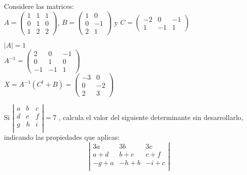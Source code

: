 \documentclass[addpoints,spanish, 12pt,a4paper]{exam}
\begin{document}
\begin{questions}
\question Considere las matrices: \\
$A=\left(\begin{matrix}1 & 1 & 1\\0 & 1 & 0\\1 & 2 & 2\end{matrix}\right)
$, $B=\left(\begin{matrix}1 & 0\\0 & -1\\2 & 1\end{matrix}\right)$ y $C=\left(\begin{matrix}-2 & 0 & -1\\1 & -1 & 1\end{matrix}\right)$
\begin{solution}
    $\left|A\right|=1$ \\
    $A^{-1}=\left(\begin{matrix}2 & 0 & -1\\0 & 1 & 0\\-1 & -1 & 1\end{matrix}\right)$ \\
    $X=A^{-1}\left(C^t+B\right)=\left(\begin{matrix}-3 & 0\\0 & -2\\2 & 3\end{matrix}\right)$
\end{solution}

\question[3] Si $\left| \begin{matrix}
   a & b & c  \\
   d & e & f  \\
   g & h & i  \\
\end{matrix} \right|=7$
 , calcula el valor del siguiente determinante sin desarrollarlo, indicando las propiedades que aplicas:
 $$\left| \begin{matrix}
   3a & 3b & 3c  \\
   a+d & b+e & c+f  \\
   -g+a & -h+b & -i+c  \\
\end{matrix} \right|$$


\end{questions}
\end{document}
